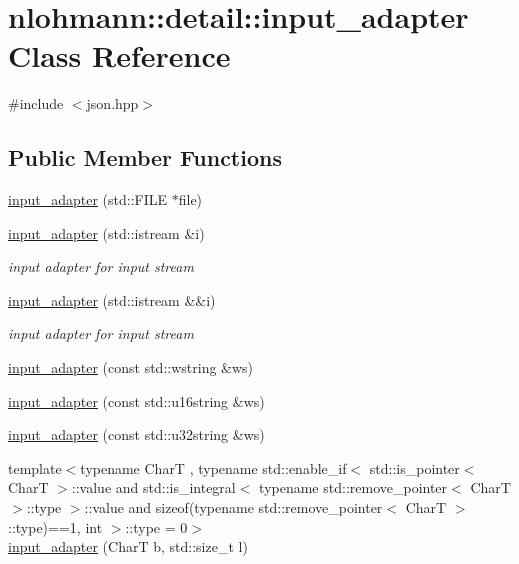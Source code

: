 \hypertarget{classnlohmann_1_1detail_1_1input__adapter}{}\section{nlohmann\+::detail\+::input\+\_\+adapter Class Reference}
\label{classnlohmann_1_1detail_1_1input__adapter}


{\ttfamily \#include $<$json.\+hpp$>$}

\subsection*{Public Member Functions}
\begin{DoxyCompactItemize}
\item 
\mbox{\hyperlink{classnlohmann_1_1detail_1_1input__adapter_a19fb8c28f37b23099a4353acf0a9a2f1}{input\+\_\+adapter}} (std\+::\+F\+I\+LE $\ast$file)
\item 
\mbox{\hyperlink{classnlohmann_1_1detail_1_1input__adapter_ae89f11268d4724b3080473f7218abe86}{input\+\_\+adapter}} (std\+::istream \&i)
\begin{DoxyCompactList}\small\item\em input adapter for input stream \end{DoxyCompactList}\item 
\mbox{\hyperlink{classnlohmann_1_1detail_1_1input__adapter_af002dd2e53ac0855a03cb68d0ce626b2}{input\+\_\+adapter}} (std\+::istream \&\&i)
\begin{DoxyCompactList}\small\item\em input adapter for input stream \end{DoxyCompactList}\item 
\mbox{\hyperlink{classnlohmann_1_1detail_1_1input__adapter_a32f5ddd06562edce43ee86f5b5c2031b}{input\+\_\+adapter}} (const std\+::wstring \&ws)
\item 
\mbox{\hyperlink{classnlohmann_1_1detail_1_1input__adapter_a58163eaa485b17dd878d3c782efc1e43}{input\+\_\+adapter}} (const std\+::u16string \&ws)
\item 
\mbox{\hyperlink{classnlohmann_1_1detail_1_1input__adapter_abe0015ae09e855f502620315b9dcc3db}{input\+\_\+adapter}} (const std\+::u32string \&ws)
\item 
{\footnotesize template$<$typename CharT , typename std\+::enable\+\_\+if$<$ std\+::is\+\_\+pointer$<$ Char\+T $>$\+::value and std\+::is\+\_\+integral$<$ typename std\+::remove\+\_\+pointer$<$ Char\+T $>$\+::type $>$\+::value and sizeof(typename std\+::remove\+\_\+pointer$<$ Char\+T $>$\+::type)==1, int $>$\+::type  = 0$>$ }\\\mbox{\hyperlink{classnlohmann_1_1detail_1_1input__adapter_a37816622d79ab4a1a76f4d7e872b65e1}{input\+\_\+adapter}} (CharT b, std\+::size\+\_\+t l)

\end{DoxyCompactItemize}
